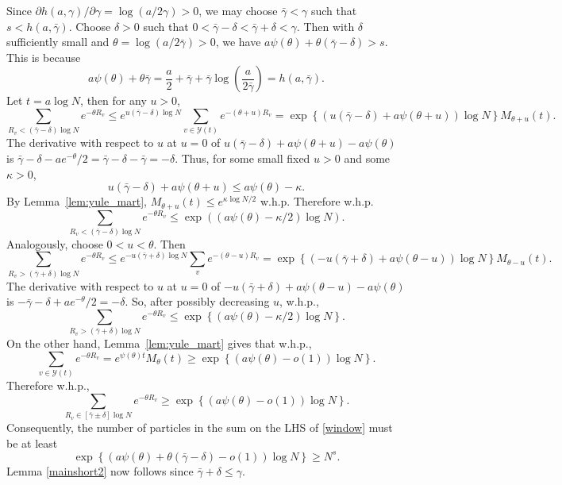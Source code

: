 \documentclass[12pt]{article}
\newcommand{\1}{\textbf{1}}
\def\a{\alpha} \def\b{\beta} \def\d{\delta} \def\D{\Delta}
\def\e{\varepsilon} \def\f{\phi} \def\F{{\Phi}} \def\vp{\varphi} \def\g{\gamma}
\def\z{\zeta} \def\th{\theta} \def\TH{\Theta} \def\Th{\Theta}  \def\l{\lambda}
\newcommand{\brac}[1]{\left(#1\right)}
\newcommand{\set}[1]{\left\{#1\right\}}
\def\dd{\text{d}}
\def\E{\mathbb{E}}
\def\Pr{\mathbb{P}}
\def\cY{{\mathcal Y}}
\newcommand{\beq}[2]{\begin{equation}\label{#1}#2\end{equation}}
\begin{document}
Since $\partial h(a,\gamma)/\partial\gamma=\log(a/2\gamma)>0$, we may choose $\bar\gamma<\gamma$ such that $s<h(a,\bar\gamma)$. Choose $\delta>0$ such that $0<\bar\gamma-\delta<\bar\gamma+\delta<\gamma$. Then with $\d$ sufficiently small and $\theta=\log\left(a/2\bar\gamma\right)>0$, we have $a\psi(\theta)+\theta(\bar\gamma-\delta)>s$. This is because 
\[
  a\psi(\theta)+\theta\bar\gamma  =\frac a2+\bar\gamma+\bar\gamma\log\!\left(\frac{a}{2\bar\gamma}\right)
  =h(a,\bar\gamma).
\]
Let $t=a\log N$, then for any $u>0$,
\[
  \sum_{R_v<(\bar\gamma-\delta)\log N} e^{-\theta R_v}\le  e^{u(\bar\gamma-\delta)\log N}\sum_{v\in\cY(t)} e^{-(\theta+u)R_v} =
  \exp\set{(u(\bar\gamma-\delta)+a\psi(\theta+u))\log N}  M_{\theta+u}(t).
\]
The derivative with respect to $u$ at $u=0$ of $u(\bar\gamma-\delta)+a\psi(\theta+u)-a\psi(\theta)$ is $  \bar\gamma-\delta-ae^{-\theta}/2=\bar\gamma-\delta-\bar\gamma =-\delta$. Thus, for some small fixed $u>0$ and some $\kappa>0$,
\[
  u(\bar\gamma-\delta)+a\psi(\theta+u)
  \le a\psi(\theta)-\kappa.
\]
By Lemma~\ref{lem:yule_mart}, $M_{\theta+u}(t)\le e^{\kappa\log N/2}$ w.h.p.  Therefore w.h.p. 
\[
  \sum_{R_v<(\bar\gamma-\delta)\log N} e^{-\theta R_v}\le  \exp\!\left((a\psi(\theta)-\kappa/2)\log N\right).
\]
Analogously, choose $0<u<\theta$.  Then
\[
  \sum_{R_v>(\bar\gamma+\delta)\log N} e^{-\theta R_v}\le  e^{-u(\bar\gamma+\delta)\log N}\sum_v e^{-(\theta-u)R_v} = \exp\set{(-u(\bar\gamma+\delta)+a\psi(\theta-u))\log N}  M_{\theta-u}(t).
\]
The derivative with respect to $u$ at $u=0$ of $  -u(\bar\gamma+  \delta)+a\psi(\theta-u)-a\psi(\theta)$ is $-\bar\gamma-\delta+ae^{-\theta}/2=-\delta$. So, after possibly decreasing $u$, w.h.p.,
\[
 \sum_{R_v>(\bar\gamma+\delta)\log N} e^{-\theta R_v}\leq  \exp\set{(a\psi(\theta)-\kappa/2)\log N}.
\]
On the other hand, Lemma~\ref{lem:yule_mart} gives that w.h.p.,
\[
  \sum_{v\in\cY(t)} e^{-\theta R_v}=e^{\psi(\theta)t}M_\theta(t)  \ge \exp\set{(a\psi(\theta)-o(1))\log N}.
\]
Therefore w.h.p., 
\beq{window}{
\sum_{R_v\in[\bar\g\pm\d]\log N}e^{-\theta R_v}\geq  \exp\set{(a\psi(\theta)-o(1))\log N}.
}
Consequently, the number of particles in the sum on the LHS of \eqref{window} must be at least
\[
  \exp\set{(a\psi(\theta)+\theta(\bar\gamma-\delta)-o(1))\log N}\geq N^s.
\]
 Lemma \ref{mainshort2} now follows since $\bar\g+\d\leq\g$.
\end{document}
